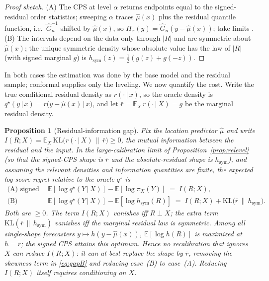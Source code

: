 \documentclass[10pt]{article} %
\newtheorem{proposition}{Proposition}
\theoremstyle{definition}
\newcommand{\E}{\mathbb{E}}
\newcommand{\KL}{\mathrm{KL}}
\newcommand{\given}{\,\vert\,}
\begin{document}
\begin{proof}[Proof sketch]
(A) The CPS at level $\alpha$ returns endpoints equal to the signed-residual order
statistics; sweeping $\alpha$ traces $\hat\mu(x)$ plus the residual quantile function,
i.e.\ $\widehat G_n^{-1}$ shifted by $\hat\mu(x)$, so $\Pi_x(y)=\widehat G_n(y-\hat\mu(x))$;
take limits \citep{vovk2019nonparametric}. (B) The intervals depend on the data only
through $|R|$ and are symmetric about $\hat\mu(x)$; the unique symmetric density whose
absolute value has the law of $|R|$ (with signed marginal $g$) is
$h_{\mathrm{sym}}(z)=\tfrac12(g(z)+g(-z))$.
\end{proof}

In both cases the estimation was done by the base model and the residual sample; conformal
supplies only the leveling. We now quantify the cost. Write the true conditional residual
density as $r(\cdot\given x)$, so the oracle density is
$q^\star(y\given x)=r\big(y-\hat\mu(x)\given x\big)$, and let
$\bar r=\E_X\,r(\cdot\given X)=g$ be the marginal residual density.

\begin{proposition}[Residual-information gap]\label{prop:gap}
Fix the location predictor $\hat\mu$ and write
$I(R;X)=\E_X\,\KL\!\big(r(\cdot\given X)\,\|\,\bar r\big)\ge 0$, the mutual information
between the residual and the input. In the large-calibration limit of
Proposition~\ref{prop:relevel} (so that the signed-CPS shape is $\bar r$ and the
absolute-residual shape is $h_{\mathrm{sym}}$), and assuming the relevant densities and
information quantities are finite, the expected log-score regret relative to the oracle
$q^\star$ is
\begin{align}
  \text{(A) signed CPS:}\quad
  &\E[\log q^\star(Y\given X)]-\E[\log \pi_X(Y)] \;=\; I(R;X), \label{eq:gapA}\\[2pt]
  \text{(B) absolute intervals:}\quad
  &\E[\log q^\star(Y\given X)]-\E[\log h_{\mathrm{sym}}(R)] \;=\; I(R;X)
     +\KL\!\big(\bar r\,\|\,h_{\mathrm{sym}}\big). \label{eq:gapB}
\end{align}
Both are $\ge 0$. The term $I(R;X)$ vanishes iff $R\perp X$; the extra term
$\KL(\bar r\,\|\,h_{\mathrm{sym}})$ vanishes iff the marginal residual law is symmetric.
Among all single-shape forecasters $y\mapsto h(y-\hat\mu(x))$, $\E[\log h(R)]$ is maximized
at $h=\bar r$; the signed CPS attains this optimum. Hence no recalibration that ignores
$X$ can reduce $I(R;X)$: it can at best replace the shape by $\bar r$, removing the
skewness term in \eqref{eq:gapB} and reducing case~(B) to case~(A). Reducing $I(R;X)$
itself requires conditioning on $X$.
\end{proposition}
\end{document}

